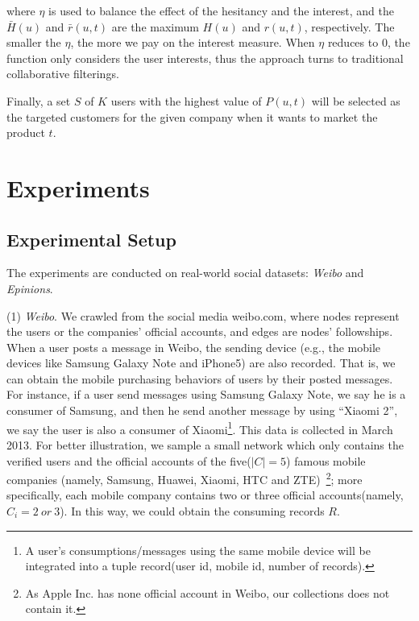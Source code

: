 \documentclass{llncs}
\begin{document}
\noindent
where $\eta$  is used to balance the effect of the hesitancy and the interest, and the $\bar{H}(u)$ and $\bar{r}(u,t)$ are the maximum $H(u)$ and $r(u,t)$, respectively. 
The smaller the $\eta$, the more we pay on the interest measure. When $\eta$ reduces to $0$, the function only considers the user interests, thus the approach turns to traditional collaborative filterings. 

Finally, a set $S$ of $K$ users with the highest value of $P(u,t)$ will be selected as the targeted customers for the given company when it wants to market the product $t$.


\vspace*{-0.3cm}
\section{Experiments}
\vspace*{-0.35cm}
\subsection{Experimental Setup}
\vspace*{-0.3cm}
The experiments are conducted on real-world social datasets: \emph{Weibo} and \emph{Epinions}.

(1) \emph{Weibo}. We crawled from the social media weibo.com, where nodes represent the users or the companies' official accounts, and edges are nodes' followships. When a user posts a message in Weibo, the sending device (e.g., the mobile devices like Samsung Galaxy Note and iPhone5) are also recorded. That is, we can obtain the mobile purchasing behaviors of users by their posted messages. For instance, if a user send messages using Samsung Galaxy Note, we say he is a consumer of Samsung, and then he send another message by using ``Xiaomi 2'', we say the user is also a consumer of Xiaomi\footnote{A user's consumptions/messages using the same mobile device will be integrated into a tuple record(user id, mobile id, number of records).}.
 This data is collected in March 2013. For better illustration, we sample a small network which only contains the verified users and the official accounts of the five($|C|=5$) famous mobile companies (namely, Samsung, Huawei, Xiaomi, HTC and ZTE)~\footnote{As Apple Inc. has none official account in Weibo, our collections does not contain it.}; more specifically, each mobile company contains two or three official accounts(namely, $C_i = 2 ~or ~3$). In this way, we could obtain the consuming records $R$.
\end{document}
